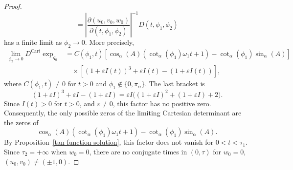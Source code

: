 \documentclass[10pt,a4paper]{amsart}
\begin{document}
\begin{proof}
\[        =
        \left|
        \frac{\partial(u_0,v_0,w_0)}
        {\partial(t,\phi_1,\phi_2)}
        \right|^{-1}
        D(t,\phi_1,\phi_2)
    \]
    has a finite limit as \(\phi_2\to0\). More precisely,
    \begin{equation}\label{e.cart-limit-w0}
        \begin{aligned}
            \lim_{\phi_2\to0}
            D^{\operatorname{Cart}}\exp_{q_0}
             & =
            C(\phi_1,t)
            \left[
                \cos_\alpha(A)
                \left(\cot_\alpha(\phi_1)\omega_1t+1\right)
                -
                \cot_\alpha(\phi_1)\sin_\alpha(A)
                \right]
            \\
             & \quad\times
            \left[
                (1+\varepsilon I(t))^3
                +
                \varepsilon I(t)
                -
                (1+\varepsilon I(t))
                \right],
        \end{aligned}
    \end{equation}
    where \(C(\phi_1,t)\neq0\) for \(t>0\) and
    \(\phi_1\notin\{0,\pi_\alpha\}\). The last bracket is
    \[
        (1+\varepsilon I)^3+\varepsilon I-(1+\varepsilon I)
        =
        \varepsilon I\bigl((1+\varepsilon I)^2+(1+\varepsilon I)+2\bigr).
    \]
    Since \(I(t)>0\) for \(t>0\), and \(\varepsilon\neq0\), this factor has no positive zero.
    Consequently, the only possible zeros of the limiting Cartesian determinant are the zeros
    of
    \[
        \cos_\alpha(A)
        \left(\cot_\alpha(\phi_1)\omega_1t+1\right)
        -
        \cot_\alpha(\phi_1)\sin_\alpha(A).
    \]
    By Proposition~\ref{tan function solution}, this factor does not vanish for
    \(0<t<\tau_1\). Since \(\tau_2=+\infty\) when \(w_0=0\), there are no conjugate times in
    \((0,\tau)\) for \(w_0=0\), \((u_0,v_0)\neq(\pm1,0)\).


\end{proof}
\end{document}
